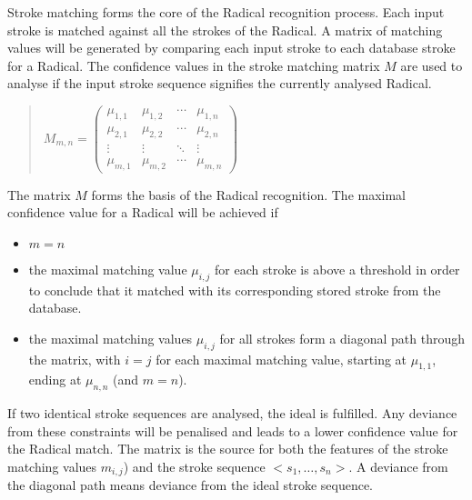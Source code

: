 Stroke matching forms the core of the Radical recognition process.
Each input stroke is matched against all the strokes of the Radical. 
A matrix of matching values will be generated by comparing each input stroke 
to each database stroke for a Radical.
The confidence values in the stroke matching matrix \(M\) are used to analyse 
if the input stroke sequence signifies the currently analysed Radical.
\begin{quote}
\(
 M_{m,n} = 
 \begin{pmatrix}
  \mu_{1,1} & \mu_{1,2} & \cdots & \mu_{1,n} \\
  \mu_{2,1} & \mu_{2,2} & \cdots & \mu_{2,n} \\
  \vdots  & \vdots  & \ddots & \vdots  \\
  \mu_{m,1} & \mu_{m,2} & \cdots & \mu_{m,n} 
 \end{pmatrix}
\)
\end{quote}
The matrix \(M\) forms the basis of the Radical recognition. The maximal 
confidence value for a Radical will be achieved if
\begin{itemize}
  \item \( m = n \) 
  \item the maximal matching value \(\mu_{i,j}\) for each stroke is above a
        threshold in order to conclude that it matched with its corresponding 
        stored stroke from the database.
  \item the maximal matching values \(\mu_{i,j}\) for all strokes form a diagonal 
        path through the matrix, with \( i = j \) for each maximal matching 
        value, starting at \(\mu_{1,1}\), ending at 
        \(\mu_{n,n}\) (and \(m=n\)).
\end{itemize}
If two identical stroke sequences are analysed, the ideal is fulfilled.
Any deviance from these constraints will be penalised and leads to a lower
confidence value for the Radical match. The matrix is the source for both 
the features of the stroke matching values \(m_{i,j}\)) and the stroke sequence
\(<s_1,\ldots,s_n>\). A deviance from the diagonal path means deviance from the 
ideal stroke sequence.



